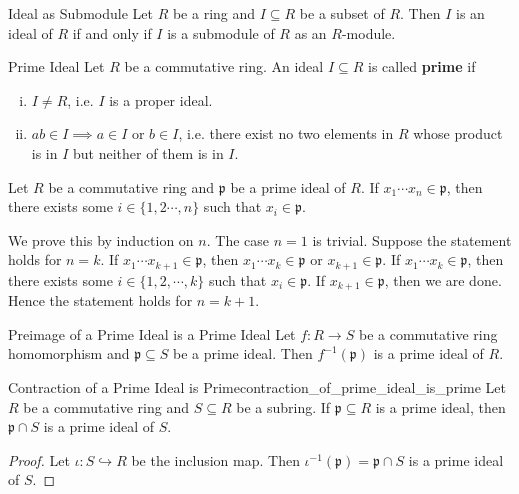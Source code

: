 \begin{proposition}{Ideal as Submodule}{}
    Let $R$ be a ring and $I\subseteq R$ be a subset of $R$. Then $I$ is an ideal of $R$ if and only if $I$ is a submodule of $R$ as an $R$-module.
\end{proposition}


\begin{definition}{Prime Ideal}{}
    Let $R$ be a commutative ring. An ideal $I\subseteq R$ is called \textbf{prime} if 
    \begin{enumerate}[(i)]
        \item $I\neq R$, i.e. $I$ is a proper ideal.
        \item $ab\in I\implies a\in I\text{ or }b\in I$, i.e. there exist no two elements in $R$ whose product is in $I$ but neither of them is in $I$.
    \end{enumerate}    
\end{definition}

\begin{proposition}{}{}
    Let $R$ be a commutative ring and $\mathfrak{p}$ be a prime ideal of $R$. If $x_1\cdots x_n\in \mathfrak{p}$, then there exists some $i\in\{1,2\cdots,n\}$ such that $x_i\in \mathfrak{p}$.
\end{proposition}
\begin{prf}
    We prove this by induction on $n$. The case $n=1$ is trivial. Suppose the statement holds for $n=k$. If $x_1\cdots x_{k+1}\in \mathfrak{p}$, then $x_1\cdots x_k\in \mathfrak{p}$ or $x_{k+1}\in \mathfrak{p}$. If $x_1\cdots x_k\in \mathfrak{p}$, then there exists some $i\in\{1,2,\cdots,k\}$ such that $x_i\in \mathfrak{p}$. If $x_{k+1}\in \mathfrak{p}$, then we are done. Hence the statement holds for $n=k+1$.
\end{prf}

\begin{proposition}{Preimage of a Prime Ideal is a Prime Ideal}{}
    Let $f:R\to S$ be a commutative ring homomorphism and $\mathfrak{p}\subseteq S$ be a prime ideal. Then $f^{-1}(\mathfrak{p})$ is a prime ideal of $R$.
\end{proposition}
\begin{corollary}{Contraction of a Prime Ideal is Prime}{contraction_of_prime_ideal_is_prime}
    Let $R$ be a commutative ring and $S\subseteq R$ be a subring. If $\mathfrak{p}\subseteq R$ is a prime ideal, then $\mathfrak{p}\cap S$ is a prime ideal of $S$.
\end{corollary}
\begin{proof}
    Let $\iota:S\hookrightarrow R$ be the inclusion map. Then $\iota^{-1}(\mathfrak{p})=\mathfrak{p}\cap S$ is a prime ideal of $S$.
\end{proof}

